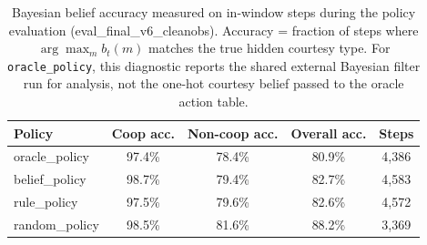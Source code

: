 \begin{table}[htbp]
\centering
\caption{Bayesian belief accuracy measured on in-window steps during the
  policy evaluation (eval\_final\_v6\_cleanobs).
  Accuracy = fraction of steps where $\arg\max_m b_t(m)$ matches the true
  hidden courtesy type. For \texttt{oracle\_policy}, this diagnostic reports
  the shared external Bayesian filter run for analysis, not the one-hot
  courtesy belief passed to the oracle action table.}
\label{tab:belief_accuracy}
\small
\begin{tabular}{lcccc}
\toprule
\textbf{Policy} & \textbf{Coop acc.} & \textbf{Non-coop acc.} & \textbf{Overall acc.} & \textbf{Steps} \\
\midrule
oracle\_policy & 97.4\% & 78.4\% & 80.9\% & 4{,}386 \\
belief\_policy & 98.7\% & 79.4\% & 82.7\% & 4{,}583 \\
rule\_policy   & 97.5\% & 79.6\% & 82.6\% & 4{,}572 \\
random\_policy & 98.5\% & 81.6\% & 88.2\% & 3{,}369 \\
\bottomrule
\end{tabular}
\end{table}
